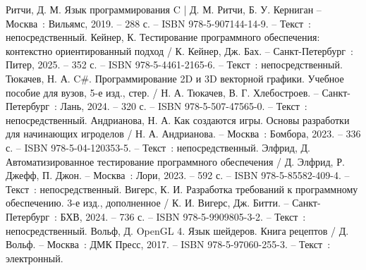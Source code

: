 \begin{thebibliography}{9}
     Ритчи, Д. М. Язык программирования C | Д. М. Ритчи, Б. У. Керниган – Москва~: Вильямс, 2019. – 288 с. – ISBN 978-5-907144-14-9. – Текст~: непосредственный.
     Кейнер, К. Тестирование программного обеспечения: контекстно ориентированный подход / К. Кейнер, Дж. Бах. – Санкт-Петербург~: Питер, 2025. – 352 с. – ISBN 978-5-4461-2165-6. – Текст~: непосредственный.
     Тюкачев, Н. А. C\#. Программирование 2D и 3D векторной графики. Учебное пособие для вузов, 5-е изд., стер. / Н. А. Тюкачев, В. Г. Хлебостроев. – Санкт-Петербург~: Лань, 2024. – 320 с. – ISBN 978-5-507-47565-0. – Текст~: непосредственный.
     Андрианова, Н. А. Как создаются игры. Основы разработки для начинающих игроделов / Н. А. Андрианова. – Москва~: Бомбора, 2023. – 336 с. – ISBN 978-5-04-120353-5. – Текст~: непосредственный.
     Элфрид, Д. Автоматизированное тестирование программного обеспечения / Д. Элфрид, Р. Джефф, П. Джон. – Москва~: Лори, 2023. – 592 с. – ISBN 978-5-85582-409-4. – Текст~: непосредственный.
     Вигерс, К. И. Разработка требований к программному обеспечению. 3-е изд., дополненное / К. И. Вигерс, Дж. Битти. – Санкт-Петербург~: БХВ, 2024. – 736 с. – ISBN 978-5-9909805-3-2. – Текст~: непосредственный.
     Вольф, Д. OpenGL 4. Язык шейдеров. Книга рецептов / Д. Вольф. – Москва~: ДМК Пресс, 2017. – ISBN 978-5-97060-255-3. – Текст~: электронный.
\end{thebibliography}
